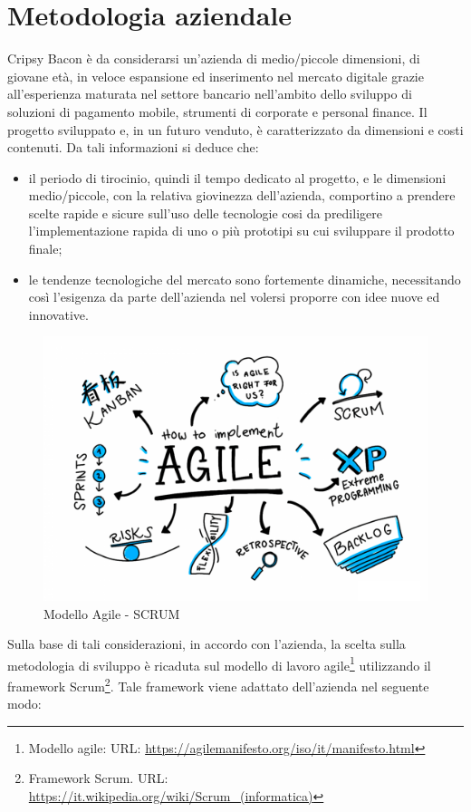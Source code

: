 \section{Metodologia aziendale}
Cripsy Bacon è da considerarsi un'azienda di medio/piccole dimensioni, di giovane età, in veloce espansione ed inserimento nel mercato digitale grazie all'esperienza maturata nel settore bancario nell'ambito dello sviluppo di soluzioni di pagamento mobile, strumenti di corporate e personal finance. Il progetto sviluppato e, in un futuro venduto, è caratterizzato da dimensioni e costi contenuti. Da tali informazioni si deduce che: 
\begin{itemize}
    \item il periodo di tirocinio, quindi il tempo dedicato al progetto, e le dimensioni medio/piccole, con la relativa giovinezza dell'azienda, comportino a prendere scelte rapide e sicure sull'uso delle tecnologie cosi da prediligere l'implementazione rapida di uno o più prototipi su cui sviluppare il prodotto finale;
    \item le tendenze tecnologiche del mercato sono fortemente dinamiche, necessitando così l'esigenza da parte dell'azienda nel volersi proporre con idee nuove ed innovative.
\end{itemize}
\begin{figure}[H] 
    \centering 
    \includegraphics[width=1\columnwidth]{immagini/scrum.png}
    \caption{\label{fig:agile_scrum}Modello Agile - SCRUM}
\end{figure}
Sulla base di tali considerazioni, in accordo con l'azienda, la scelta sulla metodologia di sviluppo è ricaduta sul modello di lavoro agile\footnote{Modello agile: URL: \href{https://agilemanifesto.org/iso/it/manifesto.html}{https://agilemanifesto.org/iso/it/manifesto.html}} utilizzando il framework Scrum\footnote{Framework Scrum. URL: \href{https://it.wikipedia.org/wiki/Scrum\_(informatica)}{https://it.wikipedia.org/wiki/Scrum\_(informatica)}}. Tale framework viene adattato dell'azienda nel seguente modo:
